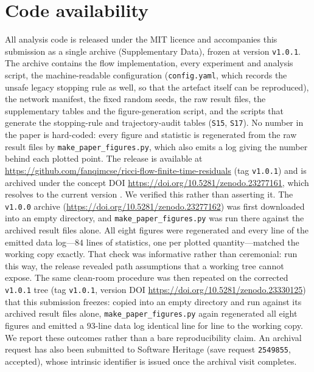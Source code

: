 \documentclass[11pt]{article}
\begin{document}
\section*{Code availability}
All analysis code is released under the {MIT} licence and accompanies this
submission as a single archive (Supplementary Data), frozen at version
\texttt{v1.0.1}. The archive contains the flow implementation, every
experiment and analysis script, the machine-readable configuration
(\texttt{config.yaml}, which records the unsafe legacy stopping rule as well,
so that the artefact itself can be reproduced), the network manifest, the
fixed random seeds, the raw result files, the supplementary tables and the
figure-generation script, and the scripts that generate the stopping-rule and
trajectory-audit tables (\texttt{S15}, \texttt{S17}). No number in the paper
is hard-coded: every figure
and statistic is regenerated from the raw result files by
\texttt{make\_paper\_figures.py}, which also emits a log giving the number
behind each plotted point. The release is available at \url{https://github.com/fanqimcse/ricci-flow-finite-time-residuals}
(tag \texttt{v1.0.1}) and is archived under the concept {DOI}
\url{https://doi.org/10.5281/zenodo.23277161}, which resolves to the
current version \cite{Fan2026Code}. We verified this rather than asserting it. The
\texttt{v1.0.0} archive (\url{https://doi.org/10.5281/zenodo.23277162}) was
first downloaded into an empty directory, and \texttt{make\_paper\_figures.py} was run there
against the archived result files alone. All eight figures were regenerated and
every line of the emitted data log---$84$ lines of statistics, one per plotted
quantity---matched the working copy exactly. That check was informative rather
than ceremonial: run this way, the release revealed path assumptions that a
working tree cannot expose. The same clean-room procedure was then repeated on
the corrected \texttt{v1.0.1} tree (tag \texttt{v1.0.1}, version DOI
\url{https://doi.org/10.5281/zenodo.23330125}) that this submission freezes:
copied into an empty directory and run against its archived result files alone,
\texttt{make\_paper\_figures.py} again regenerated all eight figures and emitted
a $93$-line data log identical line for line to the working copy. We report
these outcomes rather than a bare reproducibility claim. An archival request has
also been submitted to {Software
Heritage} (save request \texttt{2549855}, accepted), whose intrinsic
identifier is issued once the archival visit completes.



\end{document}
